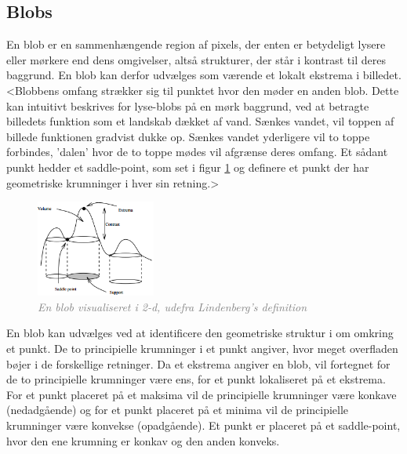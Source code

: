 \subsection{Blobs}\label{sec:blobs}
En blob er en sammenhængende region af pixels, der enten er betydeligt lysere eller mørkere end dens omgivelser, altså strukturer, der står i kontrast til deres baggrund. En blob kan derfor udvælges som værende et lokalt ekstrema i billedet. <Blobbens omfang strækker sig til punktet hvor den møder en anden blob. Dette kan intuitivt beskrives for lyse-blobs på en mørk baggrund, ved at betragte billedets funktion som et landskab dækket af vand. Sænkes vandet, vil toppen af billede funktionen gradvist dukke op. Sænkes vandet yderligere vil to toppe forbindes, 'dalen' hvor de to toppe mødes vil afgrænse deres omfang. Et sådant punkt hedder et saddle-point, som set i figur \ref{fig:lindblob} og definere et punkt der har geometriske krumninger i hver sin retning.>
\begin{figure}[H]
    \centering
    \includegraphics[width=0.35\textwidth]{fig/11.png}
    \vspace{-0.5em}   
    \begin{center}
    \caption{\textcolor{gray}{\footnotesize \textit{
    En blob visualiseret i 2-d, udefra Lindenberg's definition \cite{blob}}}}
    \label{fig:lindblob}
     \end{center}
  \end{figure}
       \vspace{-2.7em}
\noindent
En blob kan udvælges ved at identificere den geometriske struktur i om omkring et punkt. De to principielle krumninger i et punkt angiver, hvor meget overfladen bøjer i de forskellige retninger. Da et ekstrema angiver en blob, vil fortegnet for de to principielle krumninger være ens, for et punkt lokaliseret på et ekstrema. For et punkt placeret på et maksima vil de principielle krumninger være konkave (nedadgående) og for et punkt placeret på et minima vil de principielle krumninger være konvekse (opadgående). Et punkt er placeret på et saddle-point, hvor den ene krumning er konkav og den anden konveks. \\ 

